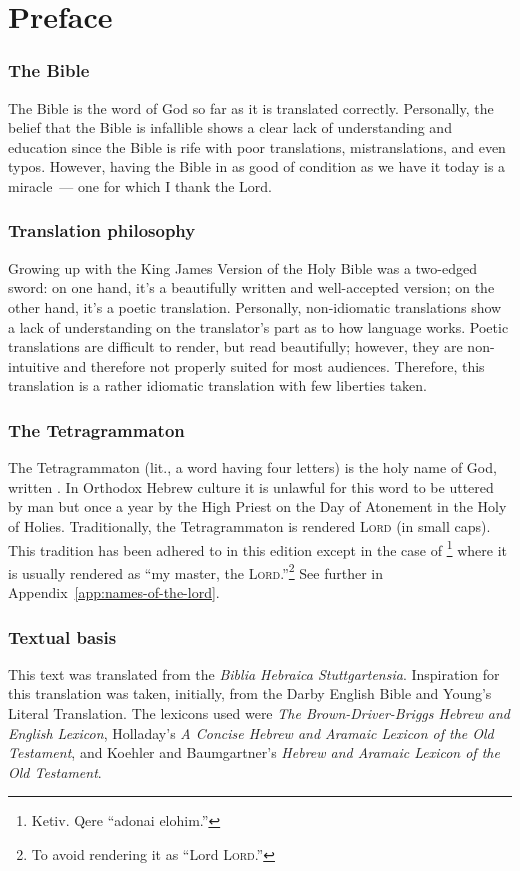 \onecolumn
\chapter*{Preface}
\subsection*{The Bible}
The Bible is the word of God so far as it is translated correctly. Personally, the belief that the Bible is infallible shows a clear lack of understanding and education since the Bible is rife with poor translations, mistranslations, and even typos. However, having the Bible in as good of condition as we have it today is a miracle~--- one for which I thank the Lord.

\subsection*{Translation philosophy}
Growing up with the King James Version of the Holy Bible was a two-edged sword: on one hand, it's a beautifully written and well-accepted version; on the other hand, it's a poetic translation. Personally, non-idiomatic translations show a lack of understanding on the translator's part as to how language works. Poetic translations are difficult to render, but read beautifully; however, they are non-intuitive and therefore not properly suited for most audiences. Therefore, this translation is a rather idiomatic translation with few liberties taken.

\subsection*{The Tetragrammaton}
The Tetragrammaton (lit., a word having four letters) is the holy name of God, written . In Orthodox Hebrew culture it is unlawful for this word to be uttered by man but once a year by the High Priest on the Day of Atonement in the Holy of Holies. Traditionally, the Tetragrammaton is rendered \textsc{Lord} (in small caps). This tradition has been adhered to in this edition except in the case of \footnote{Ketiv. Qere ``adonai elohim.''} where it is usually rendered as ``my master, the \textsc{Lord}.''\footnote{To avoid rendering it as ``Lord \textsc{Lord}.''} See further in Appendix~\ref{app:names-of-the-lord}.

\subsection*{Textual basis}
This text was translated from the \emph{Biblia Hebraica Stuttgartensia}. Inspiration for this translation was taken, initially, from the Darby English Bible and Young's Literal Translation. The lexicons used were \emph{The Brown-Driver-Briggs Hebrew and English Lexicon}, Holladay's \emph{A Concise Hebrew and Aramaic Lexicon of the Old Testament}, and Koehler and Baumgartner's \emph{Hebrew and Aramaic Lexicon of the Old Testament}.

